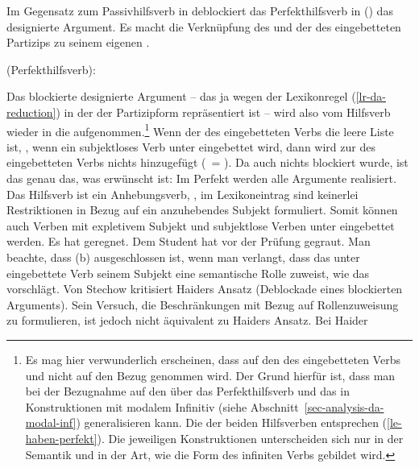 Im Gegensatz zum Passivhilfsverb in 
deblockiert das Perfekthilfsverb in () das designierte Argument.
Es macht die Verknüpfung des \subjwes und der \compsl des eingebetteten Partizips
zu seinem eigenen \compsw.

\eas
\mbox{\haben (Perfekthilfsverb):}\\
\label{le-haben-perfekt}
\zs

\noindent
Das blockierte designierte Argument -- das ja wegen der Lexikonregel (\ref{lr-da-reduction}) in der \subjl der Partizipform
repräsentiert ist -- wird also vom Hilfsverb wieder in die \compsl aufgenommen.\footnote{
  Es mag hier verwunderlich erscheinen, dass auf den \subjw des eingebetteten Verbs und nicht
  auf den \daw Bezug genommen wird. Der Grund hierfür ist, dass man bei der Bezugnahme
  auf den \subjw über das Perfekthilfsverb \haben und das \haben in Konstruktionen mit modalem
  Infinitiv (siehe Abschnitt~\ref{sec-analysis-da-modal-inf}) generalisieren kann. Die \catwe der beiden Hilfsverben entsprechen
  (\ref{le-haben-perfekt}). Die jeweiligen Konstruktionen unterscheiden sich nur in der Semantik und in der Art, wie
  die Form des infiniten Verbs gebildet wird.%
}
Wenn der \subjw des eingebetteten Verbs die leere Liste ist, \dash, wenn ein subjektloses Verb unter \haben 
eingebettet wird, dann wird zur \compsl des eingebetteten Verbs nichts hinzugefügt (\, = \sliste{}).
Da auch nichts blockiert wurde, ist das genau das, was erwünscht ist:
Im Perfekt werden alle Argumente realisiert. Das Hilfsverb ist
ein Anhebungsverb, \dash, im Lexikoneintrag sind keinerlei Restriktionen in Bezug auf ein anzuhebendes
Subjekt formuliert. Somit können auch Verben mit expletivem Subjekt 
und subjektlose Verben unter \haben eingebettet
werden.
\eal
\ex{}
Es hat geregnet.
\ex{}\label{ex-hat-gegraut}
Dem Student hat vor der Prüfung gegraut.
\zl
Man beachte, dass (b) ausgeschlossen ist, wenn man verlangt, dass das
unter \haben eingebettete Verb seinem Subjekt eine semantische Rolle zuweist,
wie das \zb \citet[]{Stechow90a} vorschlägt. Von Stechow kritisiert Haiders Ansatz
(Deblockade eines blockierten Arguments). Sein Versuch, die Beschränkungen mit Bezug
auf Rollenzuweisung zu formulieren, ist jedoch nicht äquivalent zu Haiders Ansatz. Bei Haider
